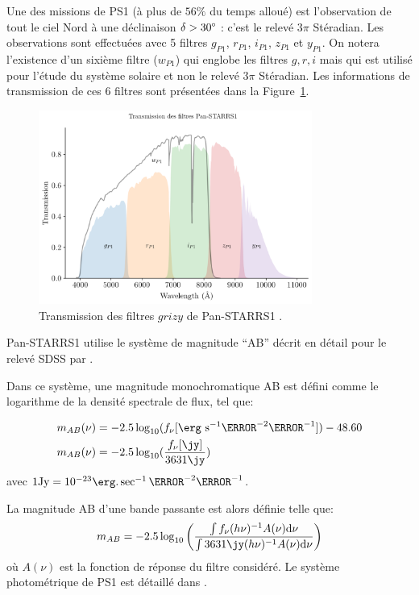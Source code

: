 \documentclass[../main/main.tex]{subfiles}
\begin{document}
Une des missions de PS1 (à plus de $56\%$ du temps alloué) est l'observation de tout le ciel Nord à une déclinaison $\delta>30\degree$ :
c'est le
relevé $3\pi$ Stéradian. Les observations sont effectuées avec 5 filtres
$g_{P1}$, $r_{P1}$, $i_{P1}$, $z_{P1}$ et $y_{P1}$. On notera
l'existence d'un  sixième
filtre ($w_{P1}$) qui
englobe les filtres $g,r,i$ mais qui est utilisé pour l'étude du système
solaire et non le relevé $3\pi$ Stéradian. Les informations
de transmission de ces $6$ filtres sont présentées dans la Figure~\ref{fig:ps1filters}.

\begin{figure}
  \centering
  \includegraphics[width=0.8\textwidth]{../figures/05_sedfit/ps1filters.png}
  \caption[Transmission des filtres Pan-STARRS1]{Transmission des
    filtres $grizy$ de Pan-STARRS1 \citep{Tonry2012}.}
  \label{fig:ps1filters}
\end{figure}


Pan-STARRS1 utilise le système de magnitude ``AB'' \citep{Oke1983}
décrit en détail pour le relevé SDSS \citep{YorkSDSS2000} par
\citet{Fukugita1996}.

Dans ce système, une magnitude monochromatique AB est défini comme le
logarithme de la densité spectrale de flux, tel que:

\begin{align}
  \label{eq:abmag}
  m_{AB}(\nu)&= -2.5\log_{10}(f_{\nu}[\erg\ \text{s}^{-1}\cm^{-2}\Hz^{-1}]) -
  48.60\\
  m_{AB}(\nu)&= -2.5\log_{10}(\frac{f_{\nu}[\jy]}{3631\jy})
\end{align}
avec $1\text{Jy} = 10^{-23}\erg.\sec^{-1}\cm^{-2}\Hz^{-1}$.

La magnitude AB d'une bande passante est alors définie telle que:
\begin{equation}
  \label{eq:abmagbp}
  m_{AB}=-2.5\log_{10}\left(\frac{\int
      f_{\nu}(h\nu)^{-1}A(\nu)\d\nu}{\int 3631\jy(h\nu)^{-1}A(\nu)\d\nu}   \right)
\end{equation}
où $A(\nu)$ est la fonction de réponse du filtre considéré. Le système
photométrique de PS1 est détaillé dans \citet{Tonry2012}.
\end{document}
